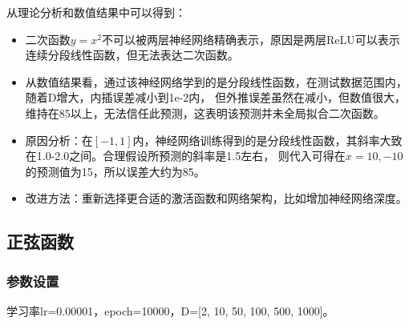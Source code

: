 \documentclass[11pt,a4 paper,one side]{article}
\begin{document}
从理论分析和数值结果中可以得到：
\begin{itemize}
    \item 二次函数$y=x^2$不可以被两层神经网络精确表示，原因是两层ReLU可以表示连续分段线性函数，但无法表达二次函数。
    \item 从数值结果看，通过该神经网络学到的是分段线性函数，在测试数据范围内，随着D增大，内插误差减小到1e-2内，
    但外推误差虽然在减小，但数值很大，维持在85以上，无法信任此预测，这表明该预测并未全局拟合二次函数。
    \item 原因分析：在$[-1,1]$内，神经网络训练得到的是分段线性函数，其斜率大致在1.0-2.0之间。合理假设所预测的斜率是1.5左右，
    则代入可得在$x=10,-10$的预测值为15，所以误差大约为85。
    \item 改进方法：重新选择更合适的激活函数和网络架构，比如增加神经网络深度。
\end{itemize}


\subsection{正弦函数}
\subsubsection{参数设置}
学习率lr=0.00001，epoch=10000，D=[2, 10, 50, 100, 500, 1000]。
\end{document}
